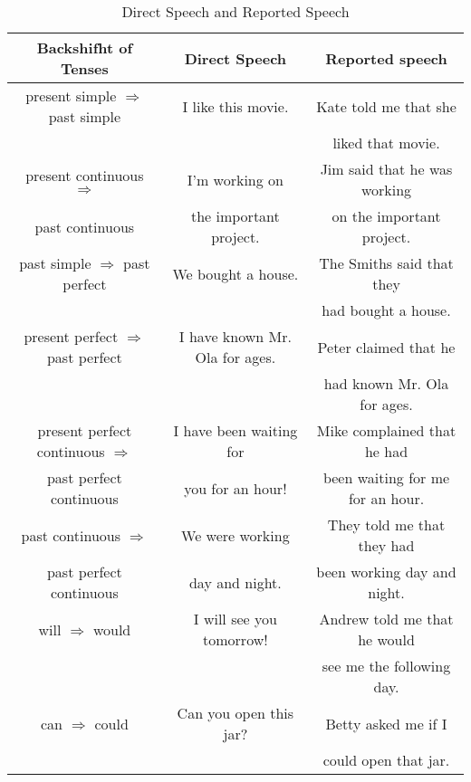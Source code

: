 \documentclass[hidelinks,10pt,a4paper]{article}
\begin{document}
\newpage
\begin{table}[h!]
\begin{center}
\begin{tabular}{|c|c|c|}
	\hline
	\textbf{Backshifht of Tenses} & \textbf{Direct Speech} & \textbf{Reported speech} \\ \hline

	present simple $\Rightarrow$ past simple & I like this movie. & Kate told me that she \\
	& & liked that movie. \\ \hline

	present continuous $\Rightarrow$ & I'm working on & Jim said that he was working \\
	past continuous  & the important project. & on the important project. \\ \hline

	past simple $\Rightarrow$ past perfect & We bought a house. & The Smiths said that they \\
	& & had bought a house. \\ \hline

	present perfect $\Rightarrow$ past perfect & I have known Mr. Ola for ages. & Peter claimed that he \\
	& & had known Mr. Ola for ages. \\ \hline

	present perfect continuous $\Rightarrow$ & I have been waiting for & Mike complained that he had \\
	past perfect continuous & you for an hour! & been waiting for me for an hour. \\ \hline

	past continuous $\Rightarrow$ & We were working & They told me that they had \\
	past perfect continuous & day and night. & been working day and night. \\ \hline

	will $\Rightarrow$ would & I will see you tomorrow! & Andrew told me that he would \\
	& & see me the following day. \\ \hline

	can $\Rightarrow$ could & Can you open this jar? & Betty asked me if I \\
	& & could open that jar. \\ \hline
\end{tabular}
\end{center}
\caption{Direct Speech and Reported Speech} \label{tab:dsrs}
\end{table}
\end{document}
